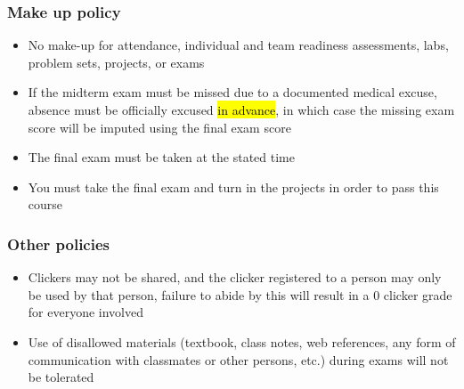 \documentclass[11pt,containsverbatim,handout,xcolor=xelatex,dvipsnames,table]{beamer}
\begin{document}

\begin{frame}
\frametitle{Make up policy}

\begin{itemize}

\item No make-up for attendance, individual and team readiness assessments, labs, problem sets, projects, or exams

\item If the midterm exam must be missed due to a documented medical excuse, absence must be officially excused \hl{in advance}, in which case the missing exam score will be imputed using the final exam score

\item The final exam must be taken at the stated time

\item You must take the final exam and turn in the projects in order to pass this course

\end{itemize}

\end{frame}


\begin{frame}
\frametitle{Other policies}

\begin{itemize}

\item Clickers may not be shared, and the clicker registered to a person may only be used by that person, failure to abide by this will result in a 0 clicker grade for everyone involved

\item Use of disallowed materials (textbook, class notes, web references, any form of communication with classmates or other persons, etc.) during exams will not be tolerated

\end{itemize}

\end{frame}

\end{document}
